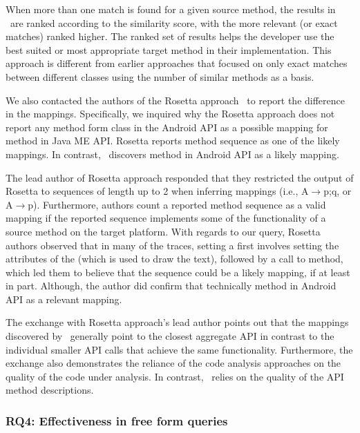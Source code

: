 When more than one match is found for a given source method, the results in \tool\ are ranked according to the similarity score, with the more relevant (or exact matches) ranked higher. 
The ranked set of results helps the developer use the best suited or most appropriate target method in their implementation. This approach is different from earlier approaches \cite{Gokhale2013ICSE,nguyen2014statistical} that focused on only exact matches between different classes using the number of similar methods as a basis. 


We also contacted the authors of the Rosetta approach~\cite{Gokhale2013ICSE} to report the difference in the mappings.
Specifically, we inquired why the Rosetta approach does not report any method form  class in the Android API as a possible mapping for
 method in Java ME API.
Rosetta reports method sequence    as one of the likely mappings.
In contrast, \tool\ discovers  method in Android API as a likely mapping.

The lead author of Rosetta approach responded that they restricted the output of
Rosetta to sequences of length up to 2 when inferring mappings (i.e., {A$\rightarrow$p;q}, or {A$\rightarrow$p}). Furthermore, authors count a reported method sequence as a valid mapping
if the reported sequence implements some of the functionality of a source method on the target platform.
With regards to our query, Rosetta authors observed that in many of the traces, setting a  first involves setting the attributes of the  (which is used to draw the text), followed by a call to  method, which led them to believe that the sequence    could be a likely mapping, if at least in part.
Although, the author did confirm that technically  method in Android API as a relevant mapping.

The exchange with Rosetta approach's lead author points out that
the mappings discovered by \tool\ generally point to
the closest aggregate API in contrast to the individual smaller API calls
that achieve the same functionality.
Furthermore, the exchange also demonstrates the reliance of the
code analysis approaches on the quality of the code under analysis.
In contrast, \tool\ relies on the quality of the API method descriptions.


\subsubsection{RQ4: Effectiveness in free form queries}

